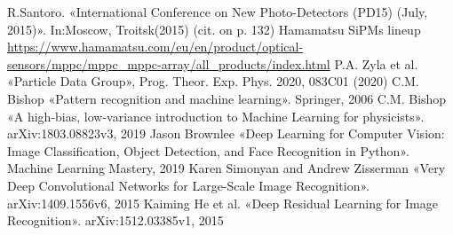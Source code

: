 \documentclass[a4paper,11pt,titlepage,oneside,openright]{book}	%
\begin{document}
\begin{backmatter}
\begin{thebibliography}{99}
			 R.Santoro. «International Conference on New Photo-Detectors (PD15) (July, 2015)». In:Moscow, Troitsk(2015) (cit. on p. 132)
			 Hamamatsu SiPMs lineup \url{https://www.hamamatsu.com/eu/en/product/optical-sensors/mppc/mppc_mppc-array/all_products/index.html}
			 P.A. Zyla et al. «Particle Data Group», Prog. Theor. Exp. Phys. 2020, 083C01 (2020)
			 C.M. Bishop «Pattern recognition and machine learning». Springer, 2006
			 C.M. Bishop «A high-bias, low-variance introduction to Machine Learning for physicists». arXiv:1803.08823v3, 2019
			 Jason Brownlee «Deep Learning for Computer Vision: Image Classification, Object Detection, and Face Recognition in Python». Machine Learning Mastery, 2019
			 Karen Simonyan and Andrew Zisserman «Very Deep Convolutional Networks for Large-Scale Image Recognition». arXiv:1409.1556v6, 2015
			 Kaiming He et al. «Deep Residual Learning for Image Recognition». arXiv:1512.03385v1, 2015
		\end{thebibliography}
		
	\end{backmatter}
	
	
\end{document}
